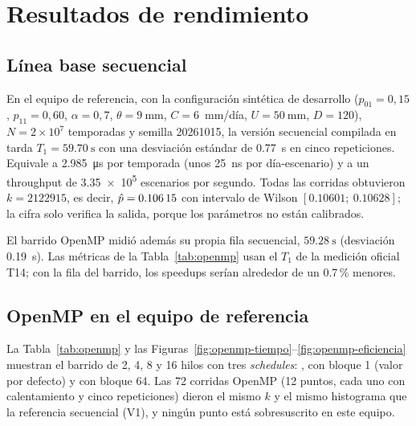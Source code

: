 \section{Resultados de rendimiento}
\label{sec:rendimiento}


\subsection{Línea base secuencial}

En el equipo de referencia, con la configuración sintética de desarrollo ($p_{01} = 0{,}15$, $p_{11} = 0{,}60$, $\alpha = 0{,}7$, $\theta = \qty{9}{\milli\metre}$, $C = 6$~mm/día, $U = \qty{50}{\milli\metre}$, $D = 120$), $N = 2\times10^{7}$ temporadas y semilla \num{20261015}, la versión secuencial compilada en  tarda $T_1 = \qty{59.70}{\second}$ con una desviación estándar de \qty{0.77}{\second} en cinco repeticiones. Equivale a \qty{2.985}{\micro\second} por temporada (unos \qty{25}{\nano\second} por día-escenario) y a un throughput de \num{3.35e5} escenarios por segundo. Todas las corridas obtuvieron $k = \num{2122915}$, es decir, $\hat{p} = \num{0.10615}$ con intervalo de Wilson $[\num{0.10601};\ \num{0.10628}]$; la cifra solo verifica la salida, porque los parámetros no están calibrados.

El barrido OpenMP midió además su propia fila secuencial, $\qty{59.28}{\second}$ (desviación \qty{0.19}{\second}). Las métricas de la Tabla~\ref{tab:openmp} usan el $T_1$ de la medición oficial T14; con la fila del barrido, los speedups serían alrededor de un \num{0.7}\,\% menores.

\subsection{OpenMP en el equipo de referencia}

La Tabla~\ref{tab:openmp} y las Figuras~\ref{fig:openmp-tiempo}--\ref{fig:openmp-eficiencia} muestran el barrido de 2, 4, 8 y 16 hilos con tres \emph{schedules}: ,  con bloque 1 (valor por defecto) y  con bloque 64. Las 72 corridas OpenMP (12 puntos, cada uno con calentamiento y cinco repeticiones) dieron el mismo $k$ y el mismo histograma que la referencia secuencial (V1), y ningún punto está sobresuscrito en este equipo.

